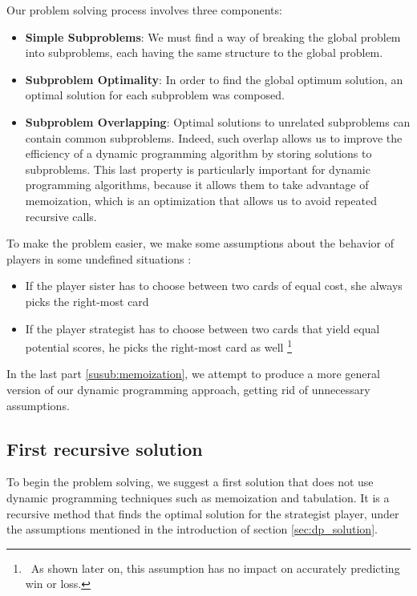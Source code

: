 \documentclass[a4paper,12pt,fleqn]{article}
\begin{document}
Our problem solving process involves three components:
\begin{itemize}
    \item \textbf{Simple Subproblems}: We must find a way of breaking the global problem into subproblems, each having the same structure to the global problem.
    \item \textbf{Subproblem Optimality}: In order to find the global optimum solution, an optimal solution for each subproblem was composed.
    \item \textbf{Subproblem Overlapping}: Optimal solutions to unrelated subproblems can contain common subproblems. Indeed, such overlap allows us to improve the efficiency of a dynamic programming algorithm by storing solutions to subproblems. This last property is particularly important for dynamic programming algorithms, because it allows them to take advantage of memoization, which is an optimization that allows us to avoid repeated recursive calls.
\end{itemize}


To make the problem easier, we make some assumptions about the behavior of players in some undefined situations :

\begin{itemize}
    \item If the player sister has to choose between two cards of equal cost, she always picks the right-most card
    \item If the player strategist has to choose between two cards that yield equal potential scores, he picks the right-most card as well \footnote{\ As shown later on, this assumption has no impact on accurately predicting win or loss.}
\end{itemize}

In the last part \ref{susub:memoization}, we attempt to produce a more general version of our dynamic programming approach, getting rid of unnecessary assumptions.

\subsection{First recursive solution}

To begin the problem solving, we suggest a first solution that does not use dynamic programming techniques such as memoization and tabulation. It is a recursive method that finds the optimal solution for the strategist player, under the assumptions mentioned in the introduction of section \ref{sec:dp_solution}.
\end{document}
